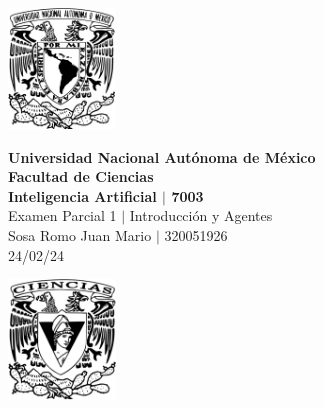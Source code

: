 \begin{center}
    \begin{minipage}{3cm}
    	\begin{center}
    		\includegraphics[height=3.2cm]{src/Img/Logo_UNAM.png}
    	\end{center}
    \end{minipage}\hfill
    \begin{minipage}{10cm}
    	\begin{center}
    	\textbf{\large Universidad Nacional Autónoma de México}\\[0.1cm]
        \textbf{Facultad de Ciencias}\\[0.1cm]
        \textbf{Inteligencia Artificial $|$ 7003}\\[0.1cm]
        Examen Parcial 1 $|$ Introducción y Agentes \\[0.1cm]
        Sosa Romo Juan Mario $|$ 320051926 \\[0.1cm]
        24/02/24
    	\end{center}
    \end{minipage}\hfill
    \begin{minipage}{3cm}
    	\begin{center}
    		\includegraphics[height=3.2cm]{src/Img/Logo_FC.png}
    	\end{center}
    \end{minipage}
\end{center}

